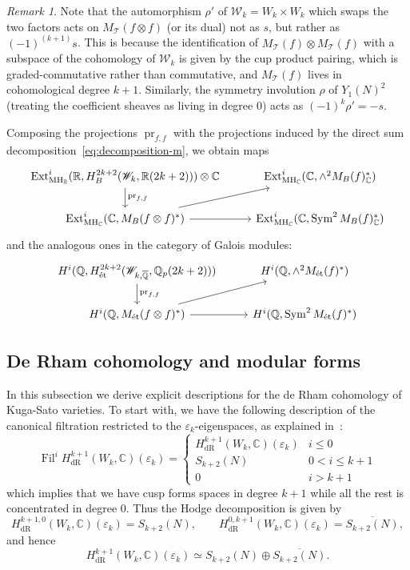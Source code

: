 \documentclass[11pt, a4paper, reqno]{amsart}
\theoremstyle{definition}
\theoremstyle{plain}
\theoremstyle{remark}
\newtheorem*{remark}{Remark}
\DeclareMathOperator{\Sym}{Sym}
\DeclareMathOperator{\Ext}{Ext}
\DeclareMathOperator{\Fil}{Fil}
\DeclareMathOperator{\et}{\acute{e}t}
\DeclareMathOperator{\dR}{dR}
\DeclareMathOperator{\pr}{pr}
\newcommand{\numberset}{\mathbb}
\newcommand{\C}{\numberset{C}}
\newcommand{\Q}{\numberset{Q}}
\newcommand{\R}{\numberset{R}}
\renewcommand{\epsilon}{\varepsilon}
\newcommand{\KS}{\mathscr{W}}
\newcommand{\theory}{\mathcal{T}}
\newcommand{\MH}{\mathrm{MH}}
\renewcommand{\le}{\leqslant}
\renewcommand{\leq}{\le}
\begin{document}
  \begin{remark}
   Note that the automorphism $\rho'$ of $\KS_k = W_k \times W_k$ which swaps the two factors acts on $M_{\theory}(f \otimes f)$ (or its dual) not as $s$, but rather as $(-1)^{(k+1)} s$. This is because the identification of $M_\theory(f) \otimes M_\theory(f)$ with a subspace of the cohomology of $\KS_k$ is given by the cup product pairing, which is graded-commutative rather than commutative, and $M_{\theory}(f)$ lives in cohomological degree $k + 1$. Similarly, the symmetry involution $\rho$ of $Y_1(N)^2$ (treating the coefficient sheaves as living in degree 0) acts as $(-1)^k \rho' = -s$.
  \end{remark}

  Composing the projections $\pr_{f, f}$ with the projections induced by the direct sum decomposition~\eqref{eq:decomposition-m}, we obtain maps
  \[
   \begin{tikzcd}
    \Ext_{\MH_\R}^i(\R, H^{2k+2}_B(\KS_k,\R(2k+2))) \otimes \C \arrow["\pr_{f,f}"]{d} & \Ext^i_{\MH_\C}(\C, \wedge^2 M_B(f)_\C^*) \\
    \Ext^i_{\MH_\C}(\C, M_B(f\otimes f)^*) \arrow{r} \arrow{ur} &
    \Ext^i_{\MH_\C}(\C,\Sym^2 M_B(f)^*_\C)
   \end{tikzcd}
  \]
and the analogous ones in the category of Galois modules:
\[
    \begin{tikzcd}
        H^i(\Q,H^{2k+2}_{\et}(\KS_{k,\overline{\Q}},\Q_p(2k+2))) \arrow["\pr_{f,f}"]{d} & H^i(\Q,\wedge^2 M_{\et}(f)^*)\\
        H^i(\Q,M_{\et}(f\otimes f)^*) \arrow{r} \arrow{ur} & H^i(\Q,\Sym^2 M_{\et}(f)^*)
    \end{tikzcd}
\]


 \subsection{De Rham cohomology and modular forms}
\label{sec:de-rham-kuga-sato}

  In this subsection we derive explicit descriptions for the de Rham cohomology of Kuga-Sato varieties. To start with, we have the following description of the canonical filtration restricted to the $\epsilon_k$-eigenspaces, as explained in~\cite[202--205]{kato04}:
  \[
   \Fil^i H^{k+1}_{\dR}(W_k,\C)(\epsilon_k) =
   \begin{cases}
    H^{k+1}_{\dR}(W_k, \C)(\epsilon_k) &\text{$i\leq 0$} \\
    S_{k+2}(N) &\text{$0<i\leq k+1$} \\
    0 &\text{$i>k+1$}
   \end{cases}
  \]
  which implies that we have cusp forms spaces in degree $k+1$ while all the rest is concentrated in degree $0$. Thus the Hodge decomposition is given by
  \[
   H^{k+1,0}_{\dR}(W_k,\C)(\epsilon_k) = S_{k+2}(N),\qquad H^{0,k+1}_{\dR}(W_k,\C)(\epsilon_k) = \overline{S_{k+2}(N)},
  \]
  and hence
  \begin{equation}
   \label{eq:cohomology-decompositions}
   H^{k+1}_{\dR}(W_k,\C)(\epsilon_k) \simeq S_{k+2}(N) \oplus \overline{S_{k+2}(N)}.
  \end{equation}
\end{document}
